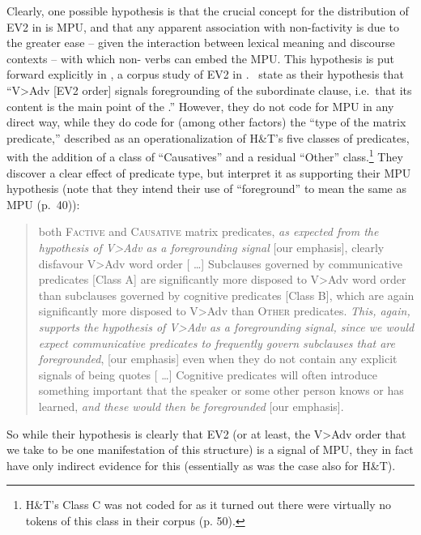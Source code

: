 \documentclass[output=paper]{langsci/langscibook}
\begin{document}
Clearly, one possible hypothesis is that the crucial concept for the distribution of EV2 in  is MPU, and that any apparent association with non-factivity is due to the greater ease -- given the interaction between lexical meaning and discourse contexts -- with which non- verbs can embed the MPU. This hypothesis is put forward explicitly in \cite{JensenChristensen2013}, a corpus study of EV2 in .\ \cite{JensenChristensen2013} state as their hypothesis that 
``V\textgreater Adv [EV2 order] signals foregrounding of the subordinate clause, i.e.\ that its content is the main point of the .''  However, they do not code for MPU in any direct way, while they do code for (among other factors)  the ``type of the matrix predicate,'' described as an operationalization of H\&T's five classes of predicates, with the addition of   a class of ``Causatives'' and a residual ``Other'' class.\footnote{H\&T's Class C was not coded for as it turned out there were virtually no tokens of this class in their corpus (p. 50).}   They discover a clear effect of predicate type, but interpret it as supporting their MPU hypothesis (note that they intend their use of ``foreground'' to mean the same as MPU (p.~40)):
\begin{quotation}
\noindent [ \ldots ] both \textsc{Factive} and \textsc{Causative} matrix predicates, \textit{as expected from the hypothesis of V\textgreater Adv as a foregrounding signal} [our emphasis], clearly disfavour V\textgreater Adv word order [ \ldots ] Subclauses governed by communicative predicates [Class A] are significantly more disposed to V\textgreater Adv word order than subclauses governed by cognitive predicates [Class B], which are again significantly more disposed to V\textgreater Adv than \textsc{Other} predicates. \textit{This, again, supports the hypothesis of V\textgreater Adv as a foregrounding signal, since we would expect communicative predicates to frequently govern subclauses that are foregrounded}, [our emphasis]  even when they do not contain any explicit signals of being quotes   [ \ldots ] Cognitive predicates will often introduce something important that the speaker or some other {person} knows or has learned, \textit{and these would then be foregrounded} [our emphasis]. \citep[50]{JensenChristensen2013}
\end{quotation}
So while their hypothesis is clearly that EV2 (or at least, the V\textgreater Adv order that we take to be one manifestation of this structure) is a signal of MPU, they in fact have only indirect evidence for this (essentially as was the case also for H\&T).
\end{document}
